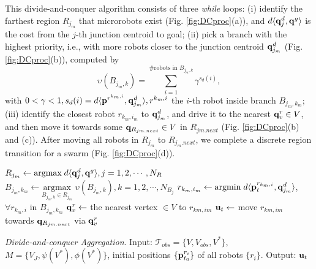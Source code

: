 This divide-and-conquer algorithm consists of three \textit{while} loops: 
(i) identify the farthest region $R_{j_m}$ that microrobots exist  (Fig. \ref{fig:DCproc}(a)), and $d \langle {\bf q}^d_j, {\bf q}^g\rangle$ is the cost from the $j$-th junction centroid to goal; 
(ii) pick a branch with the highest priority, i.e., with more robots closer to the junction centroid ${\bf q}^d_{j_m}$ (Fig. \ref{fig:DCproc}(b)), computed by 
\begin{equation}
\upsilon(B_{j_m,k}) = \sum_{i=1}^{\#\text{robots in } B_{j_m,k}}\gamma^{s_d(i)},   
\end{equation} 
with $0<\gamma<1, s_d(i)=d\langle {\bf p}^{r^{k_m,i}}, {\bf q}^d_{j_m}\rangle,  r^{k_m,i}$ the $i$-th robot inside branch $B_{j_m,k_m}$; 
(iii) identify the closest robot $r_{k_m,i_m}$ to ${\bf q}^d_{j_m}$, and drive it to the nearest ${\bf q}^r_v \in V$, and then move it towards some ${\bf q}_{R_{jm.next}}\in V$ in $R_{jm.next}$  (Fig. \ref{fig:DCproc}(b) and (c)). After moving all robots in $R_{j_m}$ to $R_{j_m.next}$, we complete a discrete region transition for a swarm  (Fig. \ref{fig:DCproc}(d)). 





\begin{algorithm}[h]
	\begin{algorithmic}[1]
		\STATE $R_{j_m} \leftarrow \textrm{argmax}\; d \langle {\bf q}^d_j, {\bf q}^g\rangle, j = 1,2, \dotsm, N_R$ 
		\STATE $B_{j_m,k_m} \leftarrow \underset{B_{j_m,k}\in R_{j_m}}{\textrm{argmax}}\; \upsilon(B_{j_m,k}), k=1,2,\dotsm, N_{B_j}$
		\STATE $r_{k_m,i_m} \leftarrow \textrm{argmin}\; d\langle {\bf p}^{r_{k_m,i}}_{t},{\bf q}^d_{j_m} \rangle $, $ \forall r_{k_m,i}$ in $B_{j_m,k_m}$ 
		\STATE ${\bf q}^r_v \leftarrow$ the nearest vertex $\in V$ to $r_{km,im}$ 	
		\STATE ${\bf u}_t \leftarrow$ move  $r_{km,im}$ towards ${\bf q}_{R_{jm.next}}$ via ${\bf q}^{r}_v$
		\ENDWHILE
		\ENDWHILE
		\ENDWHILE
	\end{algorithmic}
	\caption{\textit {Divide-and-conquer Aggregation}. Input: $\mathcal{T}_{obs} = \{V, V_{obs}, V^*\}$, $M = \{V_J, \psi(V^*), \phi(V^*)\}$,  initial positions $\{ {\bf p}^{r_i}_{t_0}\}$ of all robots $\{r_i\}$. Output: ${\bf u}_t$   }
	\label{alg:Agg}
\end{algorithm}
 

